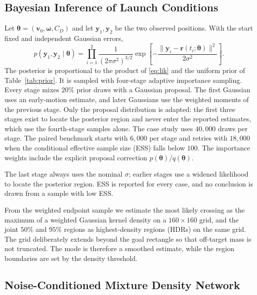 \documentclass[11pt,a4paper]{article}
\begin{document}
\subsection{Bayesian Inference of Launch Conditions}

Let $\boldsymbol{\theta}=(\mathbf{v}_0,\boldsymbol{\omega},C_D)$ and let $\mathbf{y}_1,\mathbf{y}_2$ be the two observed positions. With the start fixed and independent Gaussian errors,
\begin{equation}
  p(\mathbf{y}_1,\mathbf{y}_2\mid\boldsymbol{\theta})
  =\prod_{i=1}^{2}\frac{1}{(2\pi\sigma^2)^{3/2}}
   \exp\!\left[-\frac{\|\mathbf{y}_i-\mathbf{r}(t_i;\boldsymbol{\theta})\|^2}{2\sigma^2}\right].
  \label{eq:lik}
\end{equation}
The posterior is proportional to the product of \eqref{eq:lik} and the uniform prior of Table~\ref{tab:prior}. It is sampled with four-stage adaptive importance sampling. Every stage mixes $20\%$ prior draws with a Gaussian proposal. The first Gaussian uses an early-motion estimate, and later Gaussians use the weighted moments of the previous stage. Only the proposal distribution is adapted: the first three stages exist to locate the posterior region and never enter the reported estimates, which use the fourth-stage samples alone. The case study uses $40{,}000$ draws per stage. The paired benchmark starts with $6{,}000$ per stage and retries with $18{,}000$ when the conditional effective sample size (ESS) falls below $100$. The importance weights include the explicit proposal correction $p(\boldsymbol{\theta})/q(\boldsymbol{\theta})$.

The last stage always uses the nominal $\sigma$; earlier stages use a widened likelihood to locate the posterior region. ESS is reported for every case, and no conclusion is drawn from a sample with low ESS.

From the weighted endpoint sample we estimate the most likely crossing as the maximum of a weighted Gaussian kernel density on a $160\times160$ grid, and the joint $50\%$ and $95\%$ regions as highest-density regions (HDRs) \cite{hyndman1996} on the same grid. The grid deliberately extends beyond the goal rectangle so that off-target mass is not truncated. The mode is therefore a smoothed estimate, while the region boundaries are set by the density threshold.

\subsection{Noise-Conditioned Mixture Density Network}
\end{document}
